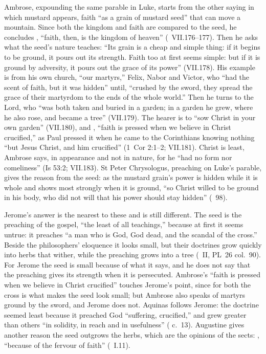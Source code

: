 Ambrose, expounding the same parable in Luke, starts from the other saying in
which mustard appears, faith ``as a grain of mustard seed'' that can move a
mountain. Since both the kingdom and faith are compared to the seed, he
concludes , ``faith, then, is the
kingdom of heaven'' (~VII.176--177). Then he asks what
the seed's nature teaches: ``Its grain is a cheap and simple thing: if it
begins to be ground, it pours out its strength. Faith too at first seems
simple: but if it is ground by adversity, it pours out the grace of its
power'' (VII.178). His example is from his own church, ``our martyrs,'' Felix,
Nabor and Victor, who ``had the scent of faith, but it was hidden'' until,
``crushed by the sword, they spread the grace of their martyrdom to the ends of
the whole world.'' Then he turns to the Lord, who ``was both taken and buried
in a garden; in a garden he grew, where he also rose, and became a tree''
(VII.179). The hearer is to ``sow Christ in your own garden'' (VII.180), and
, ``faith is pressed
when we believe in Christ crucified,'' as Paul pressed it when he came to the
Corinthians knowing nothing ``but Jesus Christ, and him crucified'' (1~Cor
2:1--2; VII.181). Christ is least, Ambrose says, in appearance and not in
nature, for he ``had no form nor comeliness'' (Is 53:2; VII.183). St Peter
Chrysologus, preaching on Luke's parable, gives the reason from the seed: as
the mustard grain's power is hidden while it is whole and shows most strongly
when it is ground, ``so Christ willed to be ground in his body, who did not
will that his power should stay hidden'' (~98).

Jerome's answer is the nearest to these and is still different. The seed is
the preaching of the gospel, ``the least of all teachings,'' because at first
it seems untrue: it preaches ``a man who is God, God dead, and the scandal of
the cross.'' Beside the philosophers' eloquence it looks small, but their
doctrines grow quickly into herbs that wither, while the preaching grows into
a tree (~II, PL~26 col.~90). For Jerome the seed is small
because of what it says, and he does not say that the preaching gives its
strength when it is persecuted. Ambrose's ``faith is pressed when we believe
in Christ crucified'' touches Jerome's point, since for both the cross is what
makes the seed look small; but Ambrose also speaks of martyrs ground by the
sword, and Jerome does not. Aquinas follows Jerome: the doctrine seemed least because
it preached God ``suffering, crucified,'' and grew greater than others ``in
solidity, in reach and in usefulness'' (
c.~13). Augustine gives another reason the seed outgrows the herbs, which are
the opinions of the sects: , ``because of the fervour
of faith'' (~I.11).

